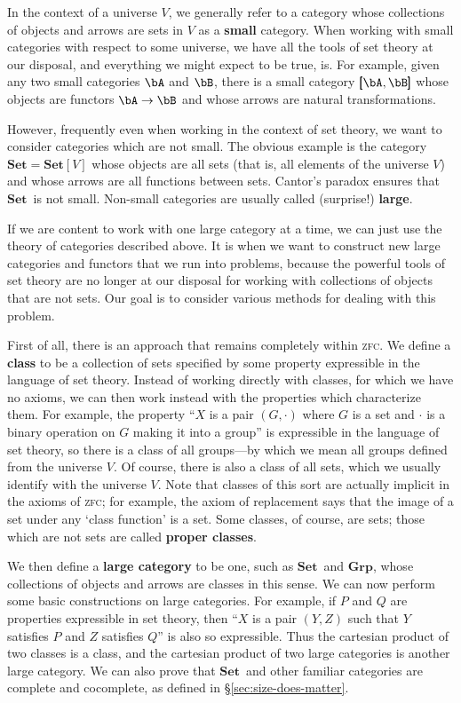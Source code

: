 \documentclass[12pt]{amsart}
\newcommand{\Set}{\ensuremath{\mathbf{Set}}}
\def\zfc{\textsc{zfc}}
\begin{document}
In the context of a universe $V$, we generally refer to a category
whose collections of objects and arrows are sets in $V$ as a
\textbf{small} category.  When working with small categories with
respect to some universe, we have all the tools of set theory at our
disposal, and everything we might expect to be true, is.  For example,
given any two small categories $\bA$ and $\bB$, there is a small
category $\pmb[\bA,\bB\pmb]$ whose objects are functors $\bA\to \bB$
and whose arrows are natural transformations.

However, frequently even when working in the context of set theory, we
want to consider categories which are not small.  The obvious example
is the category $\Set = \Set[V]$ whose objects are all sets (that is,
all elements of the universe $V$) and whose arrows are all functions
between sets.  Cantor's paradox ensures that \Set\ is not small.
Non-small categories are usually called (surprise!) \textbf{large}.

If we are content to work with one large category at a time, we can
just use the theory of categories described above.  It is when we want
to construct new large categories and functors that we run into
problems, because the powerful tools of set theory are no longer at
our disposal for working with collections of objects that are not
sets.  Our goal is to consider various methods for dealing with this
problem.

First of all, there is an approach that remains completely within \zfc.
We define a \textbf{class} to be a collection of sets specified by
some property expressible in the language of set theory.  Instead of
working directly with classes, for which we have no axioms, we can
then work instead with the properties which characterize them.  For
example, the property ``$X$ is a pair $(G,\cdot)$ where $G$ is a set
and $\cdot$ is a binary operation on $G$ making it into a group'' is
expressible in the language of set theory, so there is a class of all
groups---by which we mean all groups defined from the universe $V$.
Of course, there is also a class of all sets, which we usually
identify with the universe $V$.  Note that classes of this sort are
actually implicit in the axioms of \zfc; for example, the axiom of
replacement says that the image of a set under any `class function' is
a set.  Some classes, of course, are sets; those which are not sets
are called \textbf{proper classes}.

We then define a \textbf{large category} to be one, such as \Set\ and
$\mathbf{Grp}$, whose collections of objects and arrows are classes in
this sense.  We can now perform some basic constructions on large
categories.  For example, if $P$ and $Q$ are properties expressible in
set theory, then ``$X$ is a pair $(Y,Z)$ such that $Y$ satisfies $P$
and $Z$ satisfies $Q$'' is also so expressible.  Thus the cartesian
product of two classes is a class, and the cartesian product of two
large categories is another large category.  We can also prove that
\Set\ and other familiar categories are complete and cocomplete, as
defined in \S\ref{sec:size-does-matter}.
\end{document}
